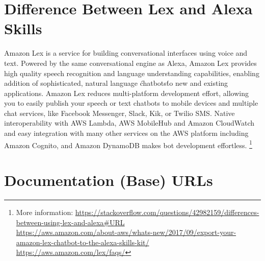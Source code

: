 
\section*{Difference Between Lex and Alexa Skills}
\label{lexAlexa}  

Amazon Lex is a service for building conversational interfaces using voice and text. Powered by the same conversational engine as Alexa, Amazon Lex provides high quality speech recognition and language understanding capabilities, enabling addition of sophisticated, natural language \'chatbots\' to new and existing applications. Amazon Lex reduces multi-platform development effort, allowing you to easily publish your speech or text chatbots to mobile devices and multiple chat services, like Facebook Messenger, Slack, Kik, or Twilio SMS. Native interoperability with AWS Lambda, AWS MobileHub and Amazon CloudWatch and easy integration with many other services on the AWS platform including Amazon Cognito, and Amazon DynamoDB makes bot development effortless. \footnote{
More information: \url{https://stackoverflow.com/questions/42982159/differences-between-using-lex-and-alexa\#URL}\\
\url{https://aws.amazon.com/about-aws/whats-new/2017/09/export-your-amazon-lex-chatbot-to-the-alexa-skills-kit/}\\
\url{https://aws.amazon.com/lex/faqs/}
}









\clearpage

\section*{Documentation (Base) URLs}




